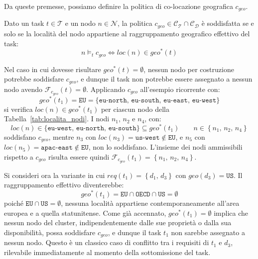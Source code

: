 Da queste premesse, possiamo definire la politica di co-locazione geografica $c_{geo}$.

\begin{policy}
\label{pol:c_geo}
    Dato un task $t \in \mathcal{T}$ e un nodo $n \in \mathcal{N}$, la politica $c_{geo} \in \mathcal{C_T} \cap \mathcal{C_D}$ è soddisfatta se e solo se la località del nodo appartiene al raggruppamento geografico effettivo del task:
    \begin{equation}
        n \models_t c_{geo}
        \iff
        loc(n) \in geo^*(t)
    \end{equation}
\end{policy}

Nel caso in cui dovesse risultare $geo^*(t) = \emptyset$, nessun nodo per costruzione potrebbe soddisfare $c_{geo}$, e dunque il task non potrebbe essere assegnato a nessun nodo avendo $\mathcal{F}_{c_{geo}}(t) = \emptyset$. Applicando $c_{geo}$ all'esempio ricorrente con: 
\begin{equation}
    geo^*(t_1) = \mathtt{EU} = \{\mathtt{eu\text{-}north},\, \mathtt{eu\text{-}south},\, \mathtt{eu\text{-}east},\, \mathtt{eu\text{-}west}\}
\end{equation}
si verifica $loc(n) \in geo^*(t_1)$ per ciascun nodo della Tabella~\ref{tab:localita_nodi}. I nodi $n_1$, $n_2$ e $n_4$, con:
\begin{equation}
    loc(n) \in \{\mathtt{eu\text{-}west},\, \mathtt{eu\text{-}north},\, \mathtt{eu\text{-}south}\}  \subseteq geo^*(t_1) 
    \qquad
    n \in \left\{ n_1,\, n_2,\, n_4 \right\}
\end{equation}
soddisfano $c_{geo}$, mentre $n_3$ con $loc(n_3) = \mathtt{us\text{-}west} \notin \mathtt{EU}$, e $n_5$ con $loc(n_5) = \mathtt{apac\text{-}east} \notin \mathtt{EU}$, non lo soddisfano. L'insieme dei nodi ammissibili rispetto a $c_{geo}$ risulta essere quindi $\mathcal{F}_{c_{geo}}(t_1) = \left\{ n_1,\, n_2,\, n_4 \right\}$.
 
Si consideri ora la variante in cui $req(t_1) = \left\{ d_1,\, d_3 \right\}$ con $geo(d_3) = \mathtt{US}$. Il raggruppamento effettivo diventerebbe:
\begin{equation}
    geo^*(t_1) = \mathtt{EU} \cap \mathtt{OECD} \cap \mathtt{US} = \emptyset
\end{equation}
poiché $\mathtt{EU} \cap \mathtt{US} = \emptyset$, nessuna località appartiene contemporaneamente all'area europea e a quella statunitense. Come già accennato, $geo^*(t_1) = \emptyset$ implica che nessun nodo del cluster, indipendentemente dalle sue proprietà o dalla sua disponibilità, possa soddisfare $c_{geo}$, e dunque il task $t_1$ non sarebbe assegnato a nessun nodo. Questo è un classico caso di conflitto tra i requisiti di $t_1$ e $d_3$, rilevabile immediatamente al momento della sottomissione del task.

